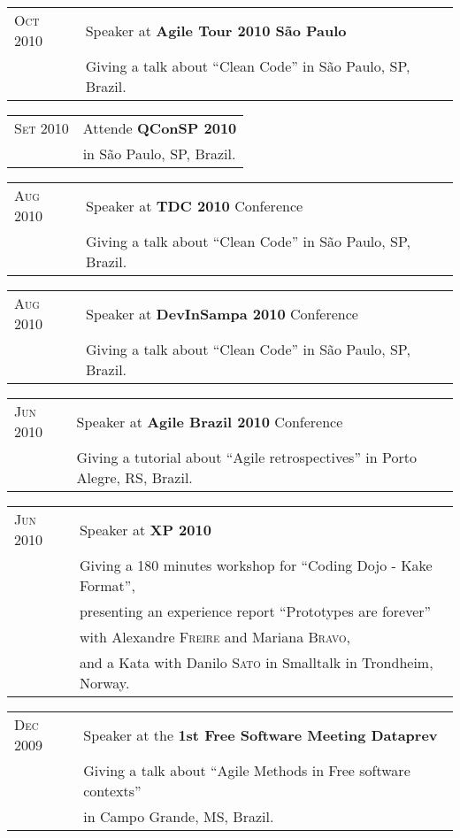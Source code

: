 \documentclass[letter,10pt]{article}
\begin{document}
\begin{tabular}{p{2.5cm}l}
  \textsc{Oct 2010} & Speaker at \textbf{Agile Tour 2010 São Paulo}\\
  &Giving a talk about ``Clean Code'' in São Paulo, SP, Brazil.\\
\end{tabular}

\begin{tabular}{p{2.5cm}l}
  \textsc{Set 2010} & Attende \textbf{QConSP 2010}\\
  & in São Paulo, SP, Brazil.\\
\end{tabular}

\begin{tabular}{p{2.5cm}l}
  \textsc{Aug 2010} & Speaker at \textbf{TDC 2010} Conference\\
  &Giving a talk about ``Clean Code'' in São Paulo, SP, Brazil.\\
\end{tabular}

\begin{tabular}{p{2.5cm}l}
  \textsc{Aug 2010} & Speaker at \textbf{DevInSampa 2010} Conference\\
  &Giving a talk about ``Clean Code'' in São Paulo, SP, Brazil.\\
\end{tabular}

\begin{tabular}{p{2.5cm}l}
  \textsc{Jun 2010} & Speaker at \textbf{Agile Brazil 2010} Conference\\
  &Giving a tutorial about ``Agile retrospectives'' in Porto Alegre, RS, Brazil.\\
\end{tabular}

\begin{tabular}{p{2.5cm}l}
  \textsc{Jun 2010} & Speaker at \textbf{XP 2010}\\
  &Giving a 180 minutes workshop for ``Coding Dojo - Kake Format'',\\
  & presenting an experience report ``Prototypes are forever''\\
  & with Alexandre \textsc{Freire} and Mariana \textsc{Bravo},\\
  & and a Kata with Danilo \textsc{Sato} in Smalltalk in Trondheim, Norway.\\
\end{tabular}

\begin{tabular}{p{2.5cm}l}
  \textsc{Dec 2009} & Speaker at the \textbf{1st Free Software Meeting Dataprev}\\
  &Giving a talk about ``Agile Methods in Free software contexts''\\
  &in Campo Grande, MS, Brazil.\\
\end{tabular}
\end{document}
